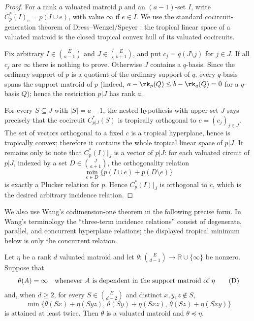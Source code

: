 \begin{proof}
For a rank $a$ valuated matroid $p$ and an $(a-1)$-set $I$, write
$C^*_p(I)_e=p(I\cup e)$, with value $\infty$ if $e\in I$.  We use the
standard cocircuit-generation theorem of Dress--Wenzel/Speyer \cite{DW,Speyer}: the
tropical linear space of a valuated matroid is the closed tropical convex
hull of its valuated cocircuits.

Fix arbitrary $I\in\binom{E}{a-1}$ and $J\in\binom{E}{b+1}$, and put
$c_j=q(J\setminus j)$ for $j\in J$.  If all $c_j$ are $\infty$ there is
nothing to prove.  Otherwise $J$ contains a $q$-basis.  Since the
ordinary support of $p$ is a quotient of the ordinary support of $q$,
every $q$-basis spans the support matroid of $p$ (indeed,
$a-\rk_p(Q)\le b-\rk_q(Q)=0$ for a $q$-basis $Q$); hence the
restriction $p|J$ has rank $a$.

For every $S\subseteq J$ with $|S|=a-1$, the nested hypothesis with
upper set $J$ says precisely that the cocircuit $C^*_{p|J}(S)$ is
tropically orthogonal to $c=(c_j)_{j\in J}$.  The set of vectors
orthogonal to a fixed $c$ is a tropical hyperplane, hence is tropically
convex; therefore it contains the whole tropical linear space of $p|J$.
It remains only to note that $C^*_p(I)|_J$ is a vector of $p|J$: for
each valuated circuit of $p|J$, indexed by a set
$D\in\binom{J}{a+1}$, the orthogonality relation
\[
 \min_{e\in D}\{p(I\cup e)+p(D\setminus e)\}
\]
is exactly a Plucker relation for $p$.  Hence $C^*_p(I)|_J$ is
orthogonal to $c$, which is the desired arbitrary incidence relation.
\end{proof}

We also use Wang's codimension-one theorem in the following precise
form.  In Wang's terminology the ``three-term incidence relations''
consist of degenerate, parallel, and concurrent hyperplane relations;
the displayed tropical minimum below is only the concurrent relation.

\begin{proposition}\label{prop:elementarytest}
Let $\eta$ be a rank $d$ valuated matroid and let
$\theta:\binom{E}{d-1}\to{\mathbb R}\cup\{\infty\}$ be nonzero.  Suppose
that
\[
        \theta(A)=\infty\quad\hbox{whenever }A
        \hbox{ is dependent in the support matroid of }\eta              \tag{D}
\]
and, when $d\ge2$, for every $S\in\binom{E}{d-2}$ and distinct $x,y,z\notin S$,
\[
\min\{\theta(Sx)+\eta(Syz),\,
      \theta(Sy)+\eta(Sxz),\,
      \theta(Sz)+\eta(Sxy)\}                                      \tag{C}
\]
is attained at least twice.  Then $\theta$ is a valuated matroid and
$\theta\preceq\eta$.
\end{proposition}

